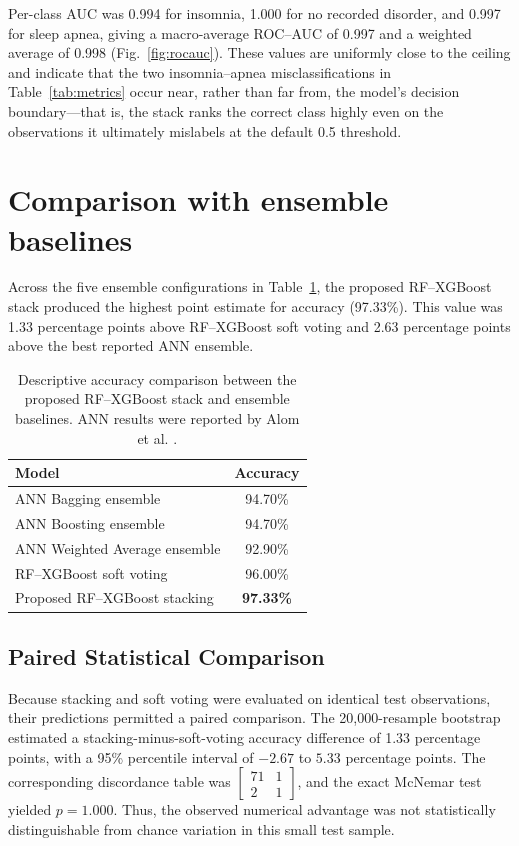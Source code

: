 \documentclass{elektr}
\begin{document}
Per-class AUC was 0.994 for insomnia, 1.000 for no recorded disorder, and 0.997 for sleep apnea, giving a macro-average ROC--AUC of 0.997 and a weighted average of 0.998 (Fig.~\ref{fig:rocauc}). These values are uniformly close to the ceiling and indicate that the two insomnia--apnea misclassifications in Table~\ref{tab:metrics} occur near, rather than far from, the model's decision boundary---that is, the stack ranks the correct class highly even on the observations it ultimately mislabels at the default 0.5 threshold.


\section{Comparison with ensemble baselines}
Across the five ensemble configurations in Table~\ref{tab:basecomparison}, the proposed RF--XGBoost stack produced the highest point estimate for accuracy (97.33\%). This value was 1.33 percentage points above RF--XGBoost soft voting and 2.63 percentage points above the best reported ANN ensemble.

\begin{table}[h]
\centering
\caption{Descriptive accuracy comparison between the proposed RF--XGBoost stack and ensemble baselines. ANN results were reported by Alom et al. \cite{alom2024}.}
\label{tab:basecomparison}
\small
\begin{tabularx}{0.74\linewidth}{@{}X c@{}}
\toprule
Model & Accuracy \\
\midrule
ANN Bagging ensemble & 94.70\% \\
ANN Boosting ensemble & 94.70\% \\
ANN Weighted Average ensemble & 92.90\% \\
RF--XGBoost soft voting & 96.00\% \\
Proposed RF--XGBoost stacking & \textbf{97.33\%} \\
\bottomrule
\end{tabularx}
\end{table}


\subsection{Paired Statistical Comparison}
Because stacking and soft voting were evaluated on identical test observations, their predictions permitted a paired comparison. The 20,000-resample bootstrap estimated a stacking-minus-soft-voting accuracy difference of 1.33 percentage points, with a 95\% percentile interval of $-2.67$ to $5.33$ percentage points. The corresponding discordance table was $\begin{bmatrix}71&1\\2&1\end{bmatrix}$, and the exact McNemar test yielded $p=1.000$. Thus, the observed numerical advantage was not statistically distinguishable from chance variation in this small test sample.
\end{document}
